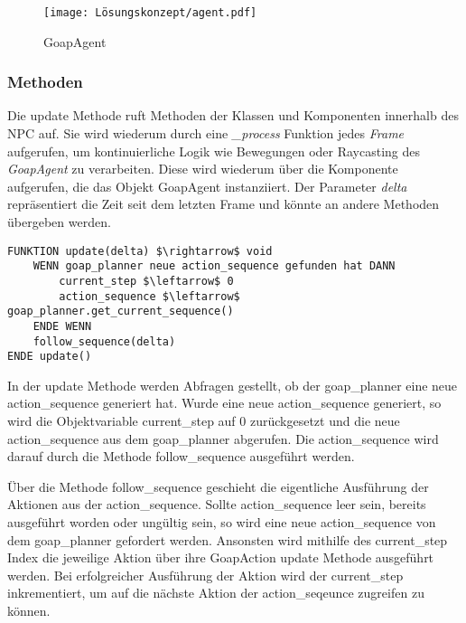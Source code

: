 \begin{figure}[h]
  \centering
  \texttt{[image: Lösungskonzept/agent.pdf]}
	\captionsetup{justification=justified, format=plain}
  \caption{GoapAgent}
  \label{fig:GoapAgent}
\end{figure}

\subsubsection{Methoden}
\label{chap:goapagent methoden}

Die update Methode ruft Methoden der Klassen und Komponenten innerhalb des NPC auf. Sie wird wiederum durch eine \textit{\_process} Funktion jedes \textit{Frame} aufgerufen, um kontinuierliche Logik wie Bewegungen oder Raycasting des \textit{GoapAgent} zu verarbeiten. Diese wird wiederum über die Komponente aufgerufen, die das Objekt GoapAgent instanziiert. Der Parameter \textit{delta} repräsentiert die Zeit seit dem letzten Frame und könnte an andere Methoden übergeben werden.

%

\begin{lstlisting}[language=Pseudo, caption={update Methode des GoapAgent}, mathescape=true]
FUNKTION update(delta) $\rightarrow$ void
    WENN goap_planner neue action_sequence gefunden hat DANN
        current_step $\leftarrow$ 0
        action_sequence $\leftarrow$ goap_planner.get_current_sequence()
    ENDE WENN
    follow_sequence(delta)
ENDE update()
\end{lstlisting}

In der update Methode werden Abfragen gestellt, ob der goap\_planner eine neue action\_sequence generiert hat. Wurde eine neue action\_sequence generiert, so wird die Objektvariable current\_step auf $0$ zurückgesetzt und die neue action\_sequence aus dem goap\_planner abgerufen. Die action\_sequence wird darauf durch die Methode follow\_sequence ausgeführt werden.

\"{U}ber die Methode follow\_sequence geschieht die eigentliche Ausführung der Aktionen aus der action\_sequence. Sollte action\_sequence leer sein, bereits ausgeführt worden oder ungültig sein, so wird eine neue action\_sequence von dem goap\_planner gefordert werden. Ansonsten wird mithilfe des current\_step Index die jeweilige Aktion über ihre GoapAction update Methode ausgeführt werden. Bei erfolgreicher Ausführung der Aktion wird der current\_step inkrementiert, um auf die nächste Aktion der action\_seqeunce zugreifen zu können.

